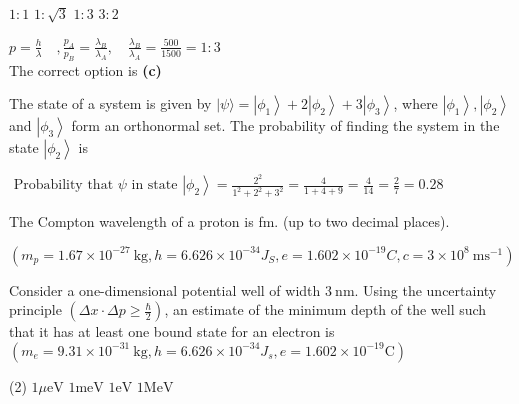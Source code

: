 \begin{enumerate}
\begin{tasks}
		\task[\textbf{A.}] $1: 1$
		\task[\textbf{B.}]$1: \sqrt{3}$
		\task[\textbf{C.}]$1: 3$
		\task[\textbf{D.}] $3: 2$
	\end{tasks}
	\begin{answer}
		$p=\frac{h}{\lambda} \quad, \frac{p_{A}}{p_{B}}=\frac{\lambda_{B}}{\lambda_{A}}, \quad \frac{\lambda_{B}}{\lambda_{A}}=\frac{500}{1500}=1: 3$\\
		The correct option is \textbf{(c)}
	\end{answer}
	\begin{minipage}{\textwidth}
		\item The state of a system is given by $|\psi\rangle=\left|\phi_{1}\right\rangle+2\left|\phi_{2}\right\rangle+3\left|\phi_{3}\right\rangle$, where $\left|\phi_{1}\right\rangle,\left|\phi_{2}\right\rangle$ and $\left|\phi_{3}\right\rangle$ form an orthonormal set. The probability of finding the system in the state $\left|\phi_{2}\right\rangle$ is
	\end{minipage}
	\begin{answer}
		$\text { Probability that } \psi \text { in state }\left|\phi_{2}\right\rangle=\frac{2^{2}}{1^{2}+2^{2}+3^{2}}=\frac{4}{1+4+9}=\frac{4}{14}=\frac{2}{7}=0.28$
	\end{answer}
	\begin{minipage}{\textwidth}
		\item The Compton wavelength of a proton is fm. (up to two decimal places).
	\end{minipage}
	\begin{answer}
		$\left(m_{p}=1.67 \times 10^{-27} \mathrm{~kg}, h=6.626 \times 10^{-34} J_{S}, e=1.602 \times 10^{-19} C, c=3 \times 10^{8} \mathrm{~ms}^{-1}\right)$
	\end{answer}
	\begin{minipage}{\textwidth}
		\item Consider a one-dimensional potential well of width $3 \mathrm{~nm}$. Using the uncertainty principle $\left(\Delta x \cdot \Delta p \geq \frac{\hbar}{2}\right)$, an estimate of the minimum depth of the well such that it has at least one bound state for an electron is $\left(m_{e}=9.31 \times 10^{-31} \mathrm{~kg}, h=6.626 \times 10^{-34} J_{s}, e=1.602 \times 10^{-19} \mathrm{C}\right)$
	\end{minipage}
	\begin{tasks}(2)
		\task[\textbf{A.}] $1 \mu \mathrm{eV}$
		\task[\textbf{B.}]$1 \mathrm{meV}$
		\task[\textbf{C.}]$1 \mathrm{eV}$
		\task[\textbf{D.}]$1 \mathrm{MeV}$

\end{tasks}
\end{enumerate}
